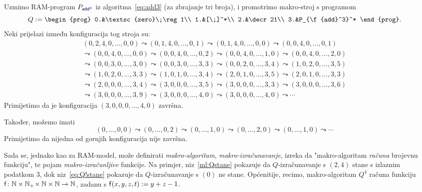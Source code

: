 \begin{primjer}[{name=[makro-program $Q$]}]\label{pr:makro}
Uzmimo RAM-program $P_{\f{add}^3}$ iz algoritma~\eqref{eq:add3} (za zbrajanje tri broja), i promotrimo makro-stroj s programom
\begin{equation}
    Q:=\begin{prog}
        0.&\textsc{zero}\;\reg1\\
        1.&[\;]^*\\
        2.&\decr21\\
        3.&P_{\f{add}^3}^*
    \end{prog}\text.
\end{equation}
Neki prijelazi između konfiguracija tog stroja su:
\begin{multline}\label{ml:Qstane}
    (0,2,4,0,\dotsc,0,0)\leadsto
    (0,1,4,0,\dotsc,0,1)\leadsto
    (0,1,4,0,\dotsc,0,0)\leadsto
    (0,0,4,0,\dotsc,0,1)\\\leadsto
    (0,0,4,0,\dotsc,0,0)\leadsto
    (0,0,4,0,\dotsc,0,2)\leadsto
    (0,0,4,0,\dotsc,1,0)\leadsto
    (0,0,4,0,\dotsc,2,0)\\\leadsto
    (0,0,3,0,\dotsc,3,0)\leadsto
    (0,0,3,0,\dotsc,3,3)\leadsto
    (0,0,2,0,\dotsc,3,4)\leadsto
    (1,0,2,0,\dotsc,3,5)\\\leadsto
    (1,0,2,0,\dotsc,3,3)\leadsto
    (1,0,1,0,\dotsc,3,4)\leadsto
    (2,0,1,0,\dotsc,3,5)\leadsto
    (2,0,1,0,\dotsc,3,3)\\\leadsto
    (2,0,0,0,\dotsc,3,4)\leadsto
    (3,0,0,0,\dotsc,3,5)\leadsto
    (3,0,0,0,\dotsc,3,3)\leadsto
    (3,0,0,0,\dotsc,3,6)\\\leadsto
    (3,0,0,0,\dotsc,3,9)\leadsto
    (3,0,0,0,\dotsc,4,0)\leadsto
    (3,0,0,0,\dotsc,4,0)\leadsto\dotsb
\end{multline}
Primijetimo da je konfiguracija $(3,0,0,0,\dotsc,4,0)$ završna.

Također, možemo imati
\begin{equation}\label{eq:Q!stane}
    (0,\dotsc,0,0)\leadsto
    (0,\dotsc,0,2)\leadsto
    (0,\dotsc,1,0)\leadsto
    (0,\dotsc,2,0)\leadsto
    (0,\dotsc,1,0)\leadsto\dotsb
\end{equation}
Primijetimo da nijedna od gornjih konfiguracija nije završna.
\end{primjer}

Sada se, jednako kao za RAM-model, može definirati \emph{makro-algoritam}, \emph{makro-izračunavanje}, izreka da "makro-algoritam \emph{računa} brojevnu funkciju", te pojam  \emph{makro-izračunljive} funkcije. Na primjer, niz~\eqref{ml:Qstane} pokazuje da $Q$-izračunavanje s $(2,4)$ stane s izlaznim podatkom $3$, dok niz~\eqref{eq:Q!stane} pokazuje da $Q$-izračunavanje s $(0)$ ne stane. Općenitije, recimo, makro-algoritam $Q^4$ računa funkciju $\f{f}\colon\N\times\N_+\!\times\N\times\N\to\N$, zadanu s $\f{f}(x,y,z,t):=y+z-1$.

